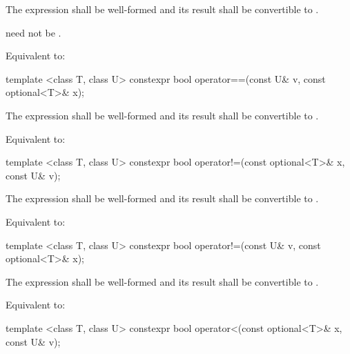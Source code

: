 \begin{itemdescr}
\pnum
\requires
The expression  shall be well-formed and
its result shall be convertible to .
\begin{note}
 need not be .
\end{note}

\pnum
\effects
Equivalent to: 
\end{itemdescr}

%
\begin{itemdecl}
template <class T, class U> constexpr bool operator==(const U& v, const optional<T>& x);
\end{itemdecl}

\begin{itemdescr}
\pnum
\requires
The expression  shall be well-formed and
its result shall be convertible to .

\pnum
\effects
Equivalent to: 
\end{itemdescr}

%
\begin{itemdecl}
template <class T, class U> constexpr bool operator!=(const optional<T>& x, const U& v);
\end{itemdecl}

\begin{itemdescr}
\pnum
\requires
The expression  shall be well-formed and
its result shall be convertible to .

\pnum
\effects
Equivalent to: 
\end{itemdescr}

%
\begin{itemdecl}
template <class T, class U> constexpr bool operator!=(const U& v, const optional<T>& x);
\end{itemdecl}

\begin{itemdescr}
\pnum
\requires
The expression  shall be well-formed and
its result shall be convertible to .

\pnum
\effects
Equivalent to: 
\end{itemdescr}

%
\begin{itemdecl}
template <class T, class U> constexpr bool operator<(const optional<T>& x, const U& v);
\end{itemdecl}


